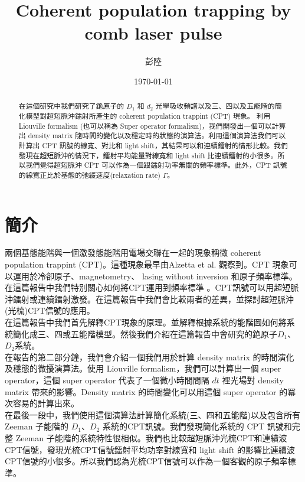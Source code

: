 \documentclass[11pt,a4paper]{article}
\title{Coherent population trapping by comb laser pulse}
\author{彭陸}
\affil[1]{國立台灣大學物理系}
\date{\today}
\begin{document}
\maketitle
\begin{abstract}
在這個研究中我們研究了銫原子的 $D_1$ 和 $d_2$ 光學吸收頻譜以及三、四以及五能階的簡化模型對超短脈沖鐳射所產生的 coherent population trappint (CPT) 現象。 利用 Liouville formalism (也可以稱為 Super operator formalism)，我們開發出一個可以計算出 density matrix 隨時間的變化以及穩定時的狀態的演算法。利用這個演算法我們可以計算出 CPT 訊號的線寬、對比和 light shift，其結果可以和連續鐳射的情形比較。我們發現在超短脈沖的情況下，鐳射平均能量對線寬和 light shift 比連續鐳射的小很多。所以我們覺得超短脈沖 CPT 可以作為一個跟鐳射功率無關的頻率標準。此外，CPT 訊號的線寬正比於基態的弛緩速度(relaxation rate) $\Gamma$。\\
\end{abstract}

\section{簡介}
兩個基態能階與一個激發態能階用電場交聯在一起的現象稱微 coherent population trappint (CPT)。這種現象最早由Alzetta et al. \cite{Alzetta1976} 觀察到。CPT 現象可以運用於冷卻原子、magnetometry、 lasing without inversion 和原子頻率標準。在這篇報告中我們特別關心如何將CPT運用到頻率標準 \cite{Vanier2005}。CPT訊號可以用超短脈沖鐳射或連續鐳射激發。在這篇報告中我們會比較兩者的差異，並探討超短脈沖(光梳)CPT信號的應用。\\

在這篇報告中我們首先解釋CPT現象的原理。並解釋根據系統的能階圖如何將系統簡化成三、四或五能階模型。然後我們介紹在這篇報告中會研究的銫原子$D_1$、$D_2$系統。\\

在報告的第二部分鐘，我們會介紹一個我們用於計算 density matrix 的時間演化及穩態的微擾演算法。使用 Liouville formalism，我們可以計算出一個 super operator，這個 super operator 代表了一個微小時間間隔 $dt$ 裡光場對 density matrix 帶來的影響。Density matrix 的時間變化可以用這個 super operator 的冪次容易的計算出來。\\

在最後一段中，我們使用這個演算法計算簡化系統(三、四和五能階)以及包含所有 Zeeman 子能階的 $D_1$、$D_2$ 系統的CPT訊號。我們發現簡化系統的 CPT 訊號和完整 Zeeman 子能階的系統特性很相似。我們也比較超短脈沖光梳CPT和連續波CPT信號，發現光梳CPT信號鐳射平均功率對線寬和 light shift 的影響比連續波CPT信號的小很多。所以我們認為光梳CPT信號可以作為一個客觀的原子頻率標準。\\
\end{document}
